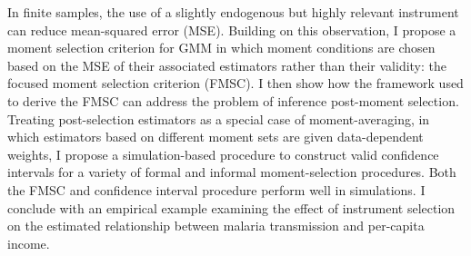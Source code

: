 In finite samples, the use of a slightly endogenous but highly relevant instrument can reduce mean-squared error (MSE). Building on this observation, I propose a moment selection criterion for GMM in which moment conditions are chosen based on the MSE of their associated estimators rather than their validity: the focused moment selection criterion (FMSC). 
I then show how the framework used to derive the FMSC can address the problem of inference post-moment selection.
Treating post-selection estimators as a special case of moment-averaging, in which estimators based on different moment sets are given data-dependent weights, I propose a simulation-based procedure to construct valid confidence intervals for a variety of formal and informal moment-selection procedures.
Both the FMSC and confidence interval procedure perform well in simulations.
I conclude with an empirical example examining the effect of instrument selection on the estimated relationship between malaria transmission and per-capita income.